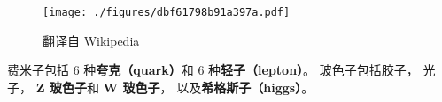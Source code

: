 
\begin{issues}
\issueDraft
\end{issues}

\begin{figure}[ht]
\centering
\texttt{[image: ./figures/dbf61798b91a397a.pdf]}
\caption{翻译自 Wikipedia} \label{fig_BasPar_2}
\end{figure}

费米子包括 6 种\textbf{夸克（quark）}和 6 种\textbf{轻子（lepton）}。 玻色子包括胶子， 光子， \textbf{Z 玻色子}和 \textbf{W 玻色子}， 以及\textbf{希格斯子（higgs）}。
